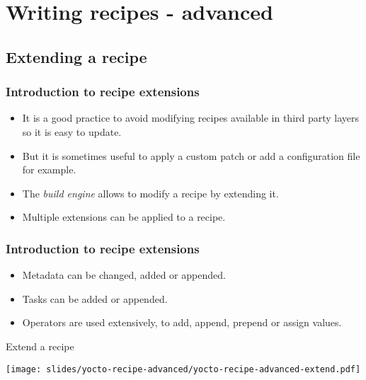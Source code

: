 \section{Writing recipes - advanced}

\subsection{Extending a recipe}

\begin{frame}
  \frametitle{Introduction to recipe extensions}
  \begin{itemize}
    \item It is a good practice to avoid modifying recipes available
          in third party layers so it is easy to update.
    \item But it is sometimes useful to apply a custom patch or add a
      configuration file for example.
    \item The  \emph{build engine} allows to modify a recipe by
          extending it.
    \item Multiple extensions can be applied to a recipe.
  \end{itemize}
\end{frame}

\begin{frame}
  \frametitle{Introduction to recipe extensions}
  \begin{itemize}
    \item Metadata can be changed, added or appended.
    \item Tasks can be added or appended.
    \item Operators are used extensively, to add, append, prepend or
          assign values.
  \end{itemize}
\end{frame}

\begin{frame}{Extend a recipe}
  \begin{center}
    \texttt{[image: slides/yocto-recipe-advanced/yocto-recipe-advanced-extend.pdf]}
  \end{center}
\end{frame}

